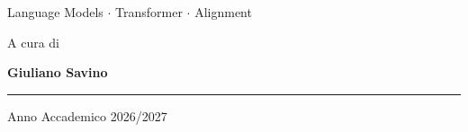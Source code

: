 \documentclass{csnotes}
\begin{document}
\begin{titlepage}
\vspace{0.5cm}

{\small\color{black!50}
Language Models
\enspace$\cdot$\enspace
Transformer
\enspace$\cdot$\enspace
Alignment\par}

\vfill

{\small\color{black!55}A cura di\par}

\vspace{0.15cm}

{\Large\bfseries\color{coverblue}
Giuliano Savino\par}

\vspace{0.9cm}

{\color{coverblue}\rule{\textwidth}{0.5pt}}

\vspace{0.35cm}

{\small\color{black!55}
Anno Accademico 2026/2027\par}

\end{titlepage}

\tableofcontents
\newpage









\end{document}
